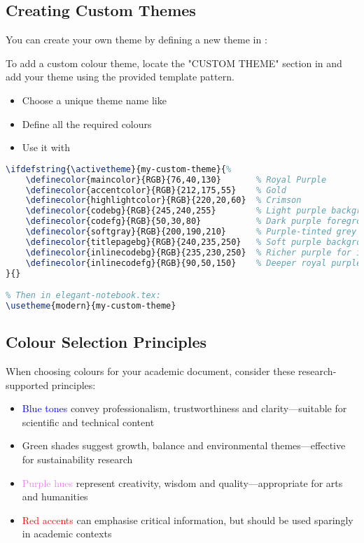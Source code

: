 \documentclass[a4paper,11pt]{article}
\begin{document}
\subsection{Creating Custom Themes}
You can create your own theme by defining a new theme in :

\begin{notetbox}
    To add a custom colour theme, locate the "CUSTOM THEME" section in  and add your theme using the provided template pattern.
    \begin{itemize}
        \item Choose a unique theme name like 
        \item Define all the required colours
        \item Use it with 
    \end{itemize}
\end{notetbox}

\begin{lstlisting}[language=TeX, caption={Custom theme definition in config/colours.tex}, label={lst:customtheme}]
% In config/colours.tex:
\ifdefstring{\activetheme}{my-custom-theme}{%
    \definecolor{maincolor}{RGB}{76,40,130}       % Royal Purple
    \definecolor{accentcolor}{RGB}{212,175,55}    % Gold
    \definecolor{highlightcolor}{RGB}{220,20,60}  % Crimson
    \definecolor{codebg}{RGB}{245,240,255}        % Light purple background
    \definecolor{codefg}{RGB}{50,30,80}           % Dark purple foreground
    \definecolor{softgray}{RGB}{200,190,210}      % Purple-tinted grey
    \definecolor{titlepagebg}{RGB}{240,235,250}   % Soft purple background
    \definecolor{inlinecodebg}{RGB}{235,230,250}  % Richer purple for inline code
    \definecolor{inlinecodefg}{RGB}{90,50,150}    % Deeper royal purple for inline code
}{}

% Then in elegant-notebook.tex:
\usetheme{modern}{my-custom-theme}
\end{lstlisting}

\subsection{Colour Selection Principles}
When choosing colours for your academic document, consider these research-supported principles:

\begin{itemize}
    \item \textcolor{blue}{Blue tones} convey professionalism, trustworthiness and clarity—suitable for scientific and technical content
    \item \textcolor{green!70!black}{Green shades} suggest growth, balance and environmental themes—effective for sustainability research
    \item \textcolor{violet}{Purple hues} represent creativity, wisdom and quality—appropriate for arts and humanities
    \item \textcolor{red}{Red accents} can emphasise critical information, but should be used sparingly in academic contexts
\end{itemize}
\end{document}
